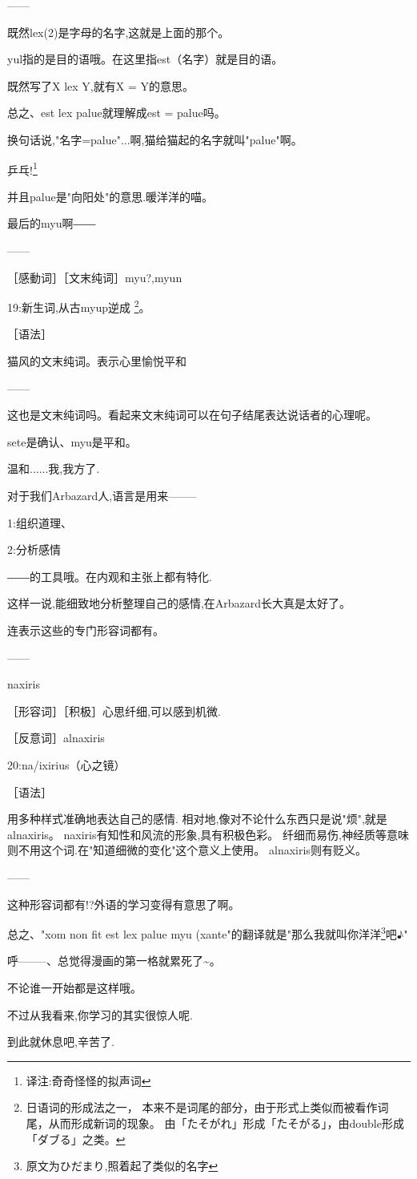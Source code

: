 ------


既然lex(2)是字母的名字,这就是上面的那个。

yul指的是目的语哦。在这里指est（名字）就是目的语。

既然写了X lex Y,就有X = Y的意思。


总之、est lex palue就理解成est = palue吗。

换句话说,"名字=palue"...啊,猫给猫起的名字就叫"palue"啊。



乒乓!\footnote{译注:奇奇怪怪的拟声词}

并且palue是"向阳处"的意思.暖洋洋的喵。

最后的myu啊――

------

［感動词］［文末纯词］myu?,myun

19:新生词,从古myup逆成
\footnote{日语词的形成法之一，
本来不是词尾的部分，由于形式上类似而被看作词尾，从而形成新词的现象。
由「たそがれ」形成「たそがる」，由double形成「ダブる」之类。}。

［语法］

猫风的文末纯词。表示心里愉悦平和


------


这也是文末纯词吗。看起来文末纯词可以在句子结尾表达说话者的心理呢。

sete是确认、myu是平和。

温和......我,我方了.



对于我们Arbazard人,语言是用来--------

1:组织道理、

2:分析感情

――的工具哦。在内观和主张上都有特化.



这样一说,能细致地分析整理自己的感情,在Arbazard长大真是太好了。

连表示这些的专门形容词都有。

------

naxiris

［形容词］［积极］心思纤细,可以感到机微.

［反意词］alnaxiris

20:na/ixirius（心之镜）

［语法］

用多种样式准确地表达自己的感情.
相对地,像对不论什么东西只是说"烦",就是alnaxiris。
naxiris有知性和风流的形象,具有积极色彩。
纤细而易伤,神经质等意味则不用这个词.在"知道细微的变化"这个意义上使用。
alnaxiris则有贬义。


------

这种形容词都有!?外语的学习变得有意思了啊。

总之、"xom non fit est lex palue myu (xante"的翻译就是"那么我就叫你洋洋\footnote{原文为ひだまり,照着起了类似的名字}吧♪"

呼--------、总觉得漫画的第一格就累死了\~{}。


不论谁一开始都是这样哦。

不过从我看来,你学习的其实很惊人呢.

到此就休息吧,辛苦了.











